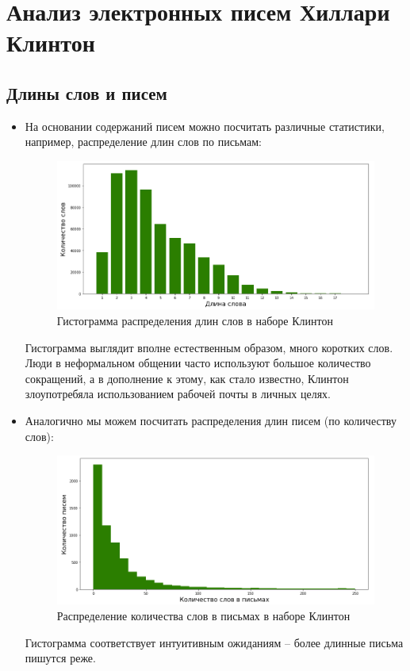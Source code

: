 \section{Анализ электронных писем Хиллари Клинтон}

\subsection{Длины слов и писем}

\begin{itemize}

\item На основании содержаний писем можно посчитать различные статистики, например,
распределение длин слов по письмам: 

\begin{figure}[H]
\centering
\includegraphics[scale=0.5]{pics/word_lengths.png}
\caption{Гистограмма распределения длин слов в наборе Клинтон}
\end{figure}


Гистограмма выглядит вполне естественным образом, много коротких слов. Люди в неформальном общении часто используют большое количество сокращений, а в дополнение к этому, как стало известно, Клинтон злоупотребяла использованием рабочей почты в личных целях.

\item Аналогично мы можем посчитать распределения длин писем (по количеству слов):

\begin{figure}[H]
\centering
\includegraphics[scale=0.5]{pics/email_lengths.png}
\caption{Распределение количества слов в письмах в наборе Клинтон}
\end{figure}

Гистограмма соответствует интуитивным ожиданиям -- более длинные письма пишутся реже. 
\end{itemize}

